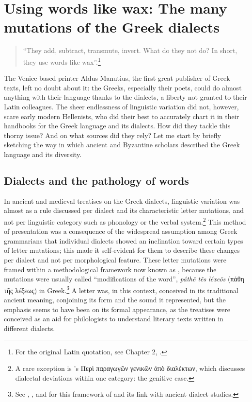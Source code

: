 \chapter{Using words like wax: The many mutations of the Greek dialects}\label{chap:6}

\begin{quote}
“They add, subtract, transmute, invert. What do they not do? In short, they use words like wax”.\footnote{{For the original Latin quotation, see Chapter 2, .}} 
\end{quote}

The Venice-based printer Aldus Manutius, the first great publisher of Greek texts, left no doubt about it: the Greeks, especially their poets, could do almost anything with their language thanks to the dialects, a liberty not granted to their Latin colleagues. The sheer endlessness of linguistic variation did not, however, scare early modern Hellenists, who did their best to accurately chart it in their handbooks for the Greek language and its dialects. How did they tackle this thorny issue? And on what sources did they rely? Let me start by briefly sketching the way in which ancient and Byzantine scholars described the Greek language and its diversity.

\section{Dialects and the pathology of words}\label{sec:6.1}

In ancient and medieval treatises on the Greek dialects, linguistic variation was almost as a rule discussed per dialect and its characteristic letter mutations, and not per linguistic category such as phonology or the verbal system.\footnote{{A rare exception is ’s Περὶ παραγωγῶν γενικῶν ἀπὸ διαλέκτων, which discusses dialectal deviations within one category: the genitive case.}} This method of presentation was a consequence of the widespread assumption among Greek grammarians that individual dialects showed an inclination toward certain types of letter mutations; this made it self-evident for them to describe these changes per dialect and not per morphological feature. These letter mutations were framed within a methodological framework now known as , because the mutations were usually called “modifications of the word”, \textit{páthē tês léxeōs} (πάθη τῆς λέξεως) in Greek.\footnote{{See \citet{Wackernagel1876}, \citet[150]{Siebenborn1976}, and \citet[esp. 118]{Lallot1995} for this framework of  and its link with ancient dialect studies.}} A letter was, in this context, conceived in its traditional ancient meaning, conjoining its form and the sound it represented, but the emphasis seems to have been on its formal appearance, as the treatises were conceived as an aid for philologists to understand literary texts written in different dialects. 


